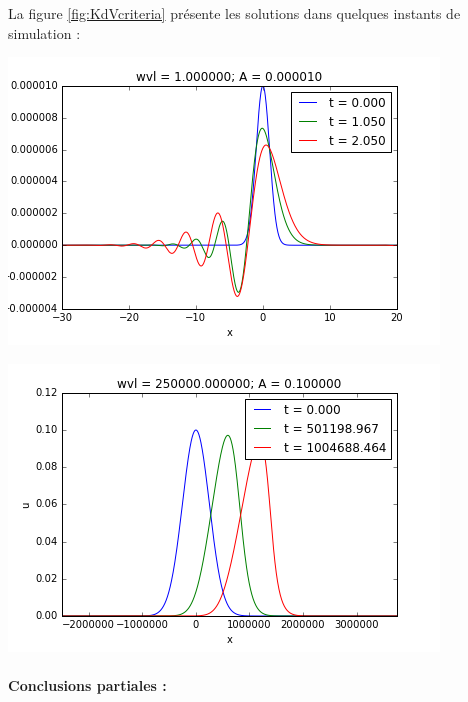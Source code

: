 \indent La figure \ref{fig:KdVcriteria} présente les solutions dans quelques instants de simulation :

\begingroup
\addtocounter{figure}{1}
\begin{minipage}[t]{\linewidth}
\begingroup
\begin{minipage}[t]{.45\linewidth}
		\includegraphics[scale=.45]{figures/criteria6.png}
	\end{minipage}
\endgroup
	\hfill
\begingroup
	\begin{minipage}[t]{.5\linewidth}
		\includegraphics[scale=.45]{figures/criteria5.png}
	\end{minipage}
	\addtocounter{figure}{-1}
\endgroup
\end{minipage}
\endgroup

\paragraph{Conclusions partiales :}



